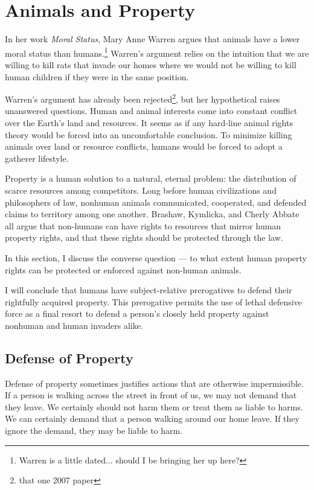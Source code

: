 \chapter{Animals and Property}

    In her work \emph{Moral Status}, Mary Anne Warren argues that animals have
    a lower moral status than humans.\footnote{Warren is a little dated...
    should I be bringing her up here?} Warren's argument relies on the intuition
    that we are willing to kill rats that invade our homes where we would not
    be willing to kill human children if they were in the same position.
    
    Warren's argument has already been rejected\footnote{that one 2007 paper},
    but her hypothetical raises unanswered questions. Human and animal interests
    come into constant conflict over the Earth's land and resources. It seems as
	if any hard-line animal rights theory would be forced into an uncomfortable
	conclusion. To minimize killing animals over land or resource conflicts,
	humans would be forced to adopt a gatherer lifestyle.

	Property is a human solution to a natural, eternal problem: the
	distribution of scarce resources among competitors. Long before human
	civilizations and philosophers of law, nonhuman animals communicated,
	cooperated, and defended claims to territory among one
	another.\autocite[23]{bradshaw_property_rights} Brashaw, Kymlicka, and
	Cherly Abbate all argue that non-humans can have rights to resources that
	mirror human property rights, and that these rights should be protected
	through the law.

	In this section, I discuss the converse question --- to what extent human
	property rights can be protected or enforced against non-human animals.

	I will conclude that humans have subject-relative prerogatives to defend
	their rightfully acquired property. This prerogative permits the use of
	lethal defensive force as a final resort to defend a person's closely held
	property against nonhuman and human invaders alike.    

\section{Defense of Property}

	Defense of property sometimes justifies actions that are otherwise
	impermissible. If a person is walking across the street in front of us, we
	may not demand that they leave. We certainly should not harm them or treat
	them as liable to harms.  We can certainly demand that a person walking
	around our home leave. If they ignore the demand, they may be liable to
	harm.

